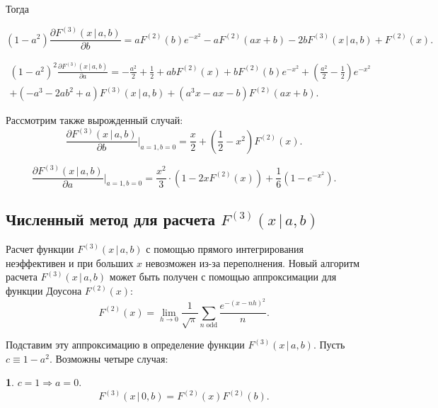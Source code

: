 \documentclass[12pt]{article}
\def\FV{F^{(2)}}
\def\FW{F^{(3)}}
\begin{document}
Тогда

\begin{equation}
    (1-a^2)\frac{\partial \FW(x \, | \, a, b)}{\partial b}  = a F^{(2)}\left(b\right) e^{- x^{2}} - a F^{(2)}\left(a x + b\right) - 2 b F^{(3)}\left(x \, | \, a, b \right) + F^{(2)}\left(x\right).
\end{equation}

\begin{multline}
    (1-a^2)^2\frac{\partial \FW(x \, | \, a, b)}{\partial a} = - \frac{a^{2}}{2} + \frac{1}{2} + a b F^{(2)}\left(x\right) + b F^{(2)}\left(b\right) e^{- x^{2}} + \left(\frac{a^{2}}{2} - \frac{1}{2}\right) e^{- x^{2}} 
    \\
    + \left(- a^{3} - 2 a b^{2} + a\right) F^{(3)}\left(x \, | \, a, b \right) + \left(a^{3} x - a x - b\right) F^{(2)}\left(a x + b\right).
\end{multline}

Рассмотрим также вырожденный случай:
\begin{equation}
    \frac{\partial \FW(x \, | \, a, b)}{\partial b}\Big|_{a=1,b=0}  = \frac{x}{2} + \left(\frac{1}{2} - x^2\right) F^{(2)}\left(x\right).
\end{equation}

\begin{equation}
    \frac{\partial \FW(x \, | \, a, b)}{\partial a}\Big|_{a=1,b=0} = \frac{x^{2}}{3} \cdot \left(1 - 2x F^{(2)}\left(x\right)\right) + \frac{1}{6} \left(1 - e^{- x^{2}}\right).
\end{equation}

\subsection*{Численный метод для расчета $\FW(x \, | \, a, b)$}
Расчет функции $\FW(x \, | \, a, b)$ с помощью прямого интегрирования неэффективен и при больших $x$ невозможен из-за переполнения. Новый алгоритм расчета $\FW(x \, | \, a, b)$ может быть получен с помощью аппроксимации для функции Доусона $\FV(x)$:
\begin{equation}
    \FV(x) = \lim_{h\rightarrow0} \frac{1}{\sqrt{\pi}} \sum\limits_{n \; \text{odd}} \frac{e^{-\left(x-nh\right)^2}}{n}.
\end{equation}

Подставим эту аппроксимацию в определение функции $\FW(x \, | \, a, b)$. Пусть $c \equiv 1 - a^2$. Возможны четыре случая:

{\bf 1}. $c = 1 \Rightarrow a = 0$.
\begin{equation}
    \FW(x \, | \, 0, b) = \FV(x)\FV(b).
\end{equation}
\end{document}
